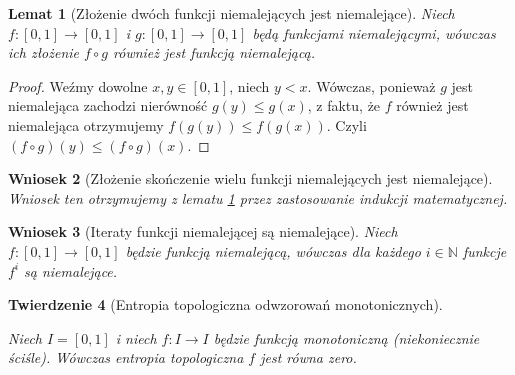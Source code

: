 \documentclass[licencjacka]{pwr_wmat_praca_dyplomowa}
\theoremstyle{plain}
\newtheorem{theorem}{Twierdzenie}
\numberwithin{theorem}{chapter}
\newtheorem{lemma}[theorem]{Lemat}
\newtheorem{corollary}[theorem]{Wniosek}
\theoremstyle{definition}
\numberwithin{theorem}{chapter}
\begin{document}
 

\begin{lemma}[Złożenie dwóch funkcji niemalejących jest niemalejące]
\label{zlozenie_dwoch_niemalejacych_jest_niemalejace}
Niech $f: [0, 1] \rightarrow [0, 1]$ i $g: [0, 1] \rightarrow [0,1]$ będą funkcjami niemalejącymi, wówczas ich złożenie $f \circ g$ również jest funkcją niemalejącą. 
\end{lemma}

\begin{proof}
Weźmy dowolne $x, y \in [0,1]$, niech $y < x$. Wówczas, ponieważ $g$ jest niemalejąca zachodzi nierówność $g(y) \leq g(x)$, z faktu, że $f$ również jest niemalejąca otrzymujemy $f(g(y)) \leq f(g(x)).$ Czyli $(f \circ g)(y) \leq (f \circ g)(x).$
\end{proof} 

\begin{corollary}[Złożenie skończenie wielu funkcji niemalejących jest niemalejące]
\label{zlozenie_skonczenie_wielu_niemalejacych_jest_niemalejace}
Wniosek ten otrzymujemy z lematu \ref{zlozenie_dwoch_niemalejacych_jest_niemalejace} przez zastosowanie indukcji matematycznej.
\end{corollary}

\begin{corollary}[Iteraty funkcji niemalejącej są niemalejące]
\label{iteraty_niemalejacych_sa_niemalejace}
Niech $f: [0, 1] \rightarrow [0, 1]$ będzie funkcją niemalejącą, wówczas dla każdego $i \in \mathbb{N}$ funkcje $f^{i}$ są niemalejące.
\end{corollary}

 
 
\begin{theorem}[Entropia topologiczna odwzorowań monotonicznych]
\label{entropia_topologiczna_odwzorowan_monotonicznych}

Niech $I = [0, 1]$ i niech $f: I \rightarrow I$ będzie funkcją monotoniczną (niekoniecznie ściśle).
Wówczas entropia topologiczna $f$ jest równa zero.
\end{theorem}
\end{document}
